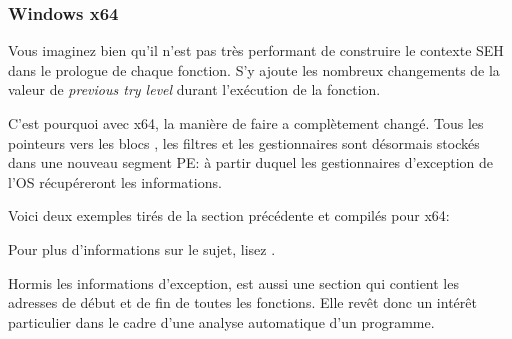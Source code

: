﻿\subsubsection{Windows x64}

\label{SEH_win64}

Vous imaginez bien qu'il n'est pas très performant de construire le contexte SEH dans le prologue
de chaque fonction. S'y ajoute les nombreux changements de la valeur de \emph{previous try level}
durant l'exécution de la fonction.

C'est pourquoi avec x64, la manière de faire a complètement changé. Tous les pointeurs vers les
blocs , les filtres et les gestionnaires sont désormais stockés dans une nouveau segment
PE:  à partir duquel les gestionnaires d'exception de l'\ac{OS} récupéreront les
informations.

Voici deux exemples tirés de la section précédente et compilés pour x64:





Pour plus d'informations sur le sujet, lisez \IgorSkochinsky.

Hormis les informations d'exception,  est aussi une section qui contient les adresses
de début et de fin de toutes les fonctions. Elle revêt donc un intérêt particulier dans le cadre
d'une analyse automatique d'un programme.

